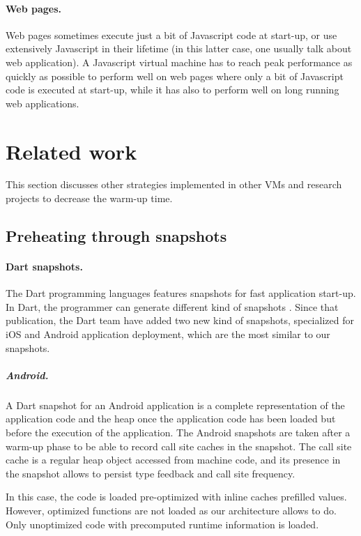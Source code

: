 \documentclass[a4paper,12pt,twoside]{../includes/ThesisStyle}
\begin{document}
\paragraph{Web pages.}
Web pages sometimes execute just a bit of Javascript code at start-up, or use extensively Javascript in their lifetime (in this latter case, one usually talk about web application). A Javascript virtual machine has to reach peak performance as quickly as possible to perform well on web pages where only a bit of Javascript code is executed at start-up, while it has also to perform well on long running web applications.

\section{Related work}
\label{sec:relWork}

This section discusses other strategies implemented in other VMs and research projects to decrease the warm-up time.

\subsection{Preheating through snapshots}

\paragraph{Dart snapshots.}

The Dart programming languages features snapshots for fast application start-up. In Dart, the programmer can generate different kind of snapshots \cite{Anna13a}. Since that publication, the Dart team have added two new kind of snapshots, specialized for iOS and Android application deployment, which are the most similar to our snapshots.

\subparagraph{Android.} A Dart snapshot for an Android application is a complete representation of the application code and the heap once the application code has been loaded but before the execution of the application. The Android snapshots are taken after a warm-up phase to be able to record call site caches in the snapshot. The call site cache is a regular heap object accessed from machine code, and its presence in the snapshot allows to persist type feedback and call site frequency.

In this case, the code is loaded pre-optimized with inline caches prefilled values. However, optimized functions are not loaded as our architecture allows to do. Only unoptimized code with precomputed runtime information is loaded.
\end{document}
